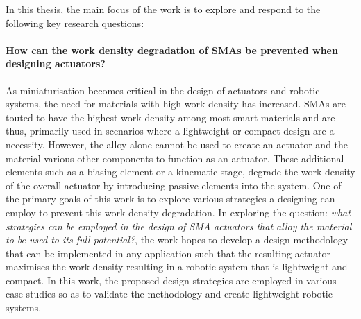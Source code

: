 In this thesis, the main focus of the work is to explore and respond to the following key research questions:

\paragraph{How can the work density degradation of SMAs be prevented when designing actuators?}
As miniaturisation becomes critical in the design of actuators and robotic systems, the need for materials with high work density has increased. SMAs are touted to have the highest work density among most smart materials and are thus, primarily used in scenarios where a lightweight or compact design are a necessity. However, the alloy alone cannot be used to create an actuator and the material various other components to function as an actuator. These additional elements such as a biasing element or a kinematic stage, degrade the work density of the overall actuator by introducing passive elements into the system. One of the primary goals of this work is to explore various strategies a designing can employ to prevent this work density degradation. In exploring the question: \textit{what strategies can be employed in the design of SMA actuators that alloy the material to be used to its full potential?}, the work hopes to develop a design methodology that can be implemented in any application such that the resulting actuator maximises the work density resulting in a robotic system that is lightweight and compact. In this work, the proposed design strategies are employed in various case studies so as to validate the methodology and create lightweight robotic systems.

